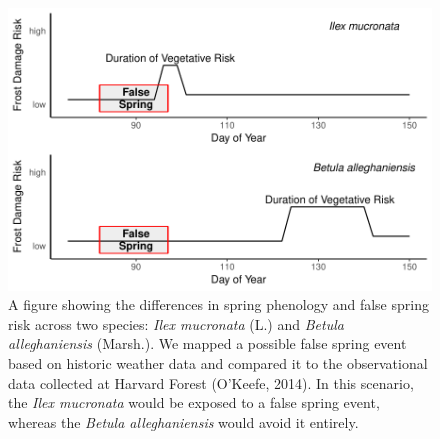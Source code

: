 \documentclass{article}\usepackage[]{graphicx}\usepackage[]{color}
\makeatletter
\def\maxwidth{ %
  \ifdim\Gin@nat@width>\linewidth
    \linewidth
  \else
    \Gin@nat@width
  \fi
}
\makeatother
\begin{document}
\begin{figure}[H]

{\centering \includegraphics[width=\maxwidth]{figure/risk-1} 

}

\caption{A figure showing the differences in spring phenology and false spring risk across two species: \textit{Ilex mucronata} (L.) and \textit{Betula alleghaniensis} (Marsh.). We mapped a possible false spring event based on historic weather data and compared it to the observational data collected at Harvard Forest (O'Keefe, 2014). In this scenario, the \textit{Ilex mucronata} would be exposed to a false spring event, whereas the \textit{Betula alleghaniensis} would avoid it entirely.}\label{fig:risk}
\end{figure}
\end{document}
